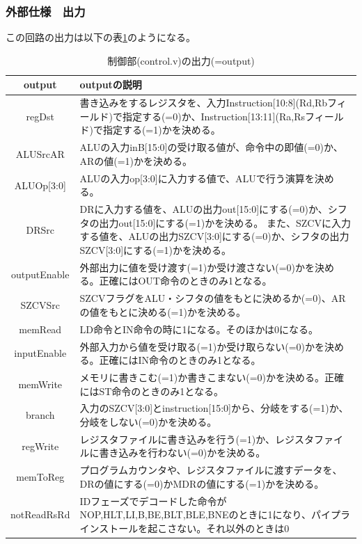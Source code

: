 \documentclass[a4j,titlepage]{jarticle}
\begin{document}
\subsubsection{外部仕様　出力}
この回路の出力は以下の表\ref{controlO}のようになる。
\begin{table}[H]
    \caption{制御部(control.v)の出力(=output)}
    \label{controlO}
    \begin{center}
    \begin {tabularx}{150mm}{|c|X|} \hline
         output & outputの説明 \\ \hline \hline
         regDst & 書き込みをするレジスタを、入力Instruction[10:8](Rd,Rbフィールド)で指定する(=0)か、Instruction[13:11](Ra,Rsフィールド)で指定する(=1)かを決める。\\ \hline %
         ALUSrcAR & ALUの入力inB[15:0]の受け取る値が、命令中の即値(=0)か、ARの値(=1)かを決める。\\ \hline
         ALUOp[3:0] & ALUの入力op[3:0]に入力する値で、ALUで行う演算を決める。\\ \hline
         DRSrc & DRに入力する値を、ALUの出力out[15:0]にする(=0)か、シフタの出力out[15:0]にする(=1)かを決める。
         また、SZCVに入力する値を、ALUの出力SZCV[3:0]にする(=0)か、シフタの出力SZCV[3:0]にする(=1)かを決める。\\ \hline
         outputEnable & 外部出力に値を受け渡す(=1)か受け渡さない(=0)かを決める。正確にはOUT命令のときのみ1となる。\\ \hline
         SZCVSrc & SZCVフラグをALU・シフタの値をもとに決めるか(=0)、ARの値をもとに決める(=1)かを決める。\\ \hline
         memRead & LD命令とIN命令の時に1になる。そのほかは0になる。\\ \hline
         inputEnable & 外部入力から値を受け取る(=1)か受け取らない(=0)かを決める。正確にはIN命令のときのみ1となる。\\ \hline
         memWrite & メモリに書きこむ(=1)か書きこまない(=0)かを決める。正確にはST命令のときのみ1となる。\\ \hline
         branch & 入力のSZCV[3:0]とinstruction[15:0]から、分岐をする(=1)か、分岐をしない(=0)かを決める。\\ \hline
         regWrite & レジスタファイルに書き込みを行う(=1)か、レジスタファイルに書き込みを行わない(=0)かを決める。\\ \hline
         memToReg & プログラムカウンタや、レジスタファイルに渡すデータを、DRの値にする(=0)かMDRの値にする(=1)かを決める。\\ \hline
         notReadRsRd & IDフェーズでデコードした命令がNOP,HLT,LI,B,BE,BLT,BLE,BNEのときに1になり、パイプラインストールを起こさない。それ以外のときは0\\ \hline

\end{tabularx}
\end{center}
\end{table}
\end{document}
